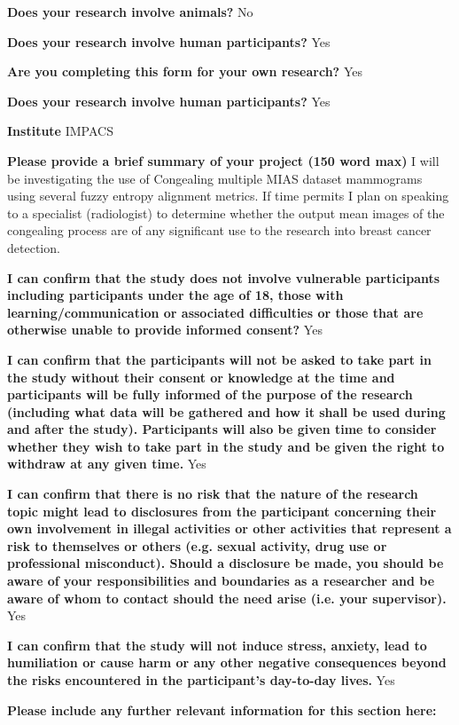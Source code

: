 \noindent \textbf{Does your research involve animals?}
No

\noindent \textbf{Does your research involve human participants?}
Yes

\noindent \textbf{Are you completing this form for your own research?}
Yes

\noindent \textbf{Does your research involve human participants?}
Yes

\noindent \textbf{Institute}
IMPACS

\noindent \textbf{Please provide a brief summary of your project (150 word max)}
I will be investigating the use of Congealing multiple MIAS dataset mammograms using several fuzzy entropy alignment metrics. If time permits I plan on speaking to a specialist (radiologist) to determine whether the output mean images of the congealing process are of any significant use to the research into breast cancer detection.

\noindent \textbf{I can confirm that the study does not involve vulnerable participants including participants under the age of 18, those with learning/communication or associated difficulties or those that are otherwise unable to provide informed consent?}
Yes

\noindent \textbf{I can confirm that the participants will not be asked to take part in the study without their consent or knowledge at the time and participants will be fully informed of the purpose of the research (including what data will be gathered and how it shall be used during and after the study). Participants will also be given time to consider whether they wish to take part in the study and be given the right to withdraw at any given time.}
Yes

\noindent \textbf{I can confirm that there is no risk that the nature of the research topic might lead to disclosures from the participant concerning their own involvement in illegal activities or other activities that represent a risk to themselves or others (e.g. sexual activity, drug use or professional misconduct). Should a disclosure be made, you should be aware of your responsibilities and boundaries as a researcher and be aware of whom to contact should the need arise (i.e. your supervisor).}
Yes

\noindent \textbf{I can confirm that the study will not induce stress, anxiety, lead to humiliation or cause harm or any other negative consequences beyond the risks encountered in the participant’s day-to-day lives.}
Yes

\noindent \textbf{Please include any further relevant information for this section here:}

